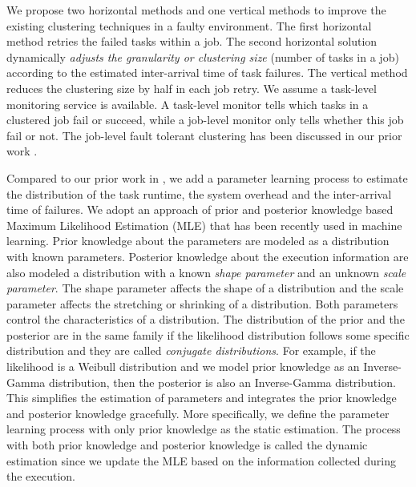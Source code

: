 We propose two horizontal methods and one vertical methods to improve the existing clustering techniques in a faulty environment. The first horizontal method retries the failed tasks within a job. The second horizontal solution dynamically \emph{adjusts the granularity or clustering size} (number of tasks in a job) according to the estimated inter-arrival time of task failures. The vertical method reduces the clustering size by half in each job retry. 
We assume a task-level monitoring service is available. A task-level monitor tells which tasks in a clustered job fail or succeed, while a job-level monitor only tells whether this job fail or not. The job-level fault tolerant clustering has been discussed in our prior work \cite{Chen2012}. 



Compared to our prior work in \cite{Chen2012}, we add a parameter learning process to estimate the distribution of the task runtime, the system overhead and the inter-arrival time of failures. We adopt an approach of prior and posterior knowledge based Maximum Likelihood Estimation (MLE) that has been recently used in machine learning. Prior knowledge about the parameters are modeled as a distribution with known parameters. Posterior knowledge about the execution information are also modeled a distribution with a known \emph{shape parameter} and an unknown \emph{scale parameter}. The shape parameter affects the shape of a distribution and the scale parameter affects the stretching or shrinking of a distribution. Both parameters control the characteristics of a distribution. The distribution of the prior and the posterior are in the same family if the likelihood distribution follows some specific distribution and they are called \emph{conjugate distributions}. For example, if the likelihood is a Weibull distribution and we model prior knowledge as an Inverse-Gamma distribution, then the posterior is also an Inverse-Gamma distribution. This simplifies the estimation of parameters and integrates the prior knowledge and posterior knowledge gracefully. More specifically, we define the parameter learning process with only prior knowledge as the static estimation. The process with both prior knowledge and posterior knowledge is called the dynamic estimation since we update the MLE based on the information collected during the execution.  


